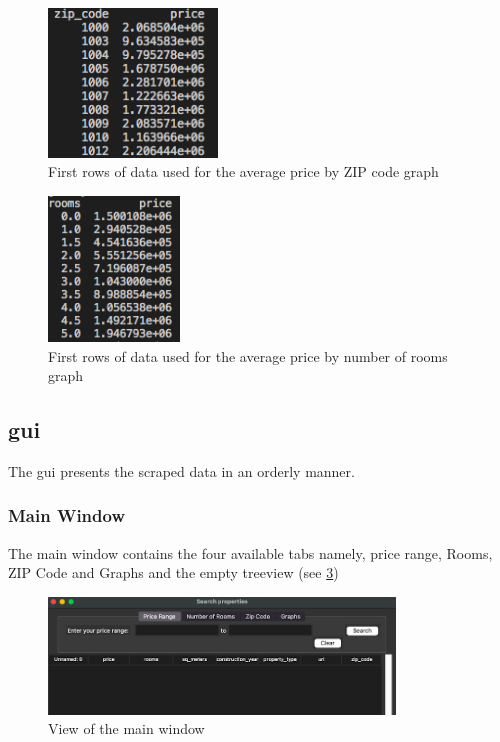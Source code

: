 \documentclass[main]{subfiles}
\begin{document}
\begin{figure}[htbp]
    \centerline{
        \includegraphics[width = 45mm]{prog_16.png}}
    \caption{First rows of data used for the average price by ZIP code graph}
    \label{fig:graph1}
\end{figure}

\begin{figure}[htbp]
    \centerline{
        \includegraphics[width =35mm]{prog_17.png}}
    \caption{First rows of data used for the average price by number of rooms graph}
    \label{fig:graph2}
\end{figure}



\subsection{\ac{gui}}
The \ac{gui} presents the scraped data in an orderly manner.


\subsubsection{Main Window}
The main window contains the four available tabs namely, price range, Rooms, 
ZIP Code and Graphs and the empty treeview (see \ref{fig:Main_Window})

\begin{figure}[htbp]
    \centerline{
        \includegraphics[width = 92mm]{prog_7.png}}
    \caption{View of the main window}
    \label{fig:Main_Window}
\end{figure}
\end{document}
